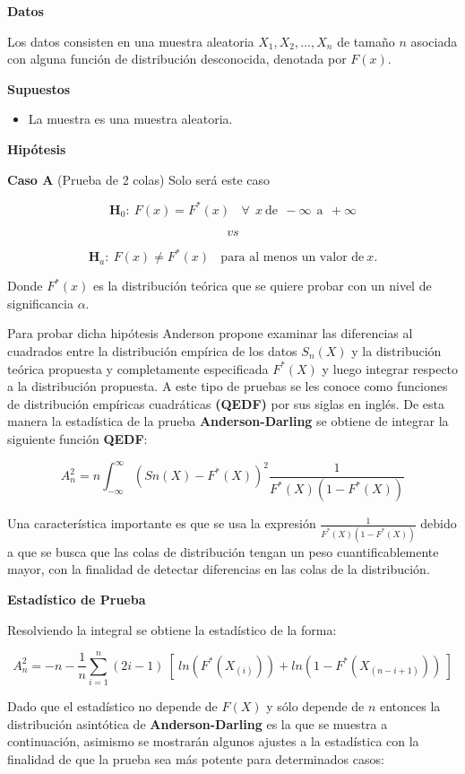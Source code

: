 \documentclass[
  a4paper,
  oneside,
  openany]{book}
\providecommand{\tightlist}{%
  \setlength{\itemsep}{0pt}\setlength{\parskip}{0pt}}
\begin{document}
\textbf{Datos}

Los datos consisten en una muestra aleatoria \(X_{1},X_{2},\ldots,X_{n}\) de tamaño \(n\) asociada con alguna función de distribución desconocida, denotada por \(F(x)\).

\textbf{Supuestos}

\begin{itemize}
\tightlist
\item
  La muestra es una muestra aleatoria.
\end{itemize}

\textbf{Hipótesis}

\textbf{Caso A} (Prueba de 2 colas) Solo será este caso

\[\textbf{H}_0: \ F(x)=F^*(x) \ \ \ \ \forall\ \ x\  \mbox{de} \ \ -\infty \ \ \mbox{a} \ \  +\infty\]

\[vs\]

\[\textbf{H}_a: \ F(x) \neq F^*(x) \ \ \ \ \mbox{para al menos un  valor de} \  x.\]

Donde \(F^*(x)\) es la distribución teórica que se quiere probar con un nivel de significancia \(\alpha\).

Para probar dicha hipótesis Anderson propone examinar las diferencias al cuadrados entre la distribución empírica de los datos \(S_{n}(X)\) y la distribución teórica propuesta y completamente
especificada \(F^*(X)\) y luego integrar respecto a la distribución propuesta.
A este tipo de pruebas se les conoce como funciones de distribución empíricas cuadráticas \textbf{(QEDF)} por
sus siglas en inglés.
De esta manera la estadística de la prueba \textbf{Anderson-Darling} se obtiene de integrar la
siguiente función \textbf{QEDF}:

\[A_n^2=n \int_{-\infty}^{\infty} (Sn(X)-F^*(X))^2 \frac{1}{F^*(X)(1-F^*(X))}\]

Una característica importante es que se usa la expresión \(\frac{1}{F^*(X)(1-F^*(X))}\)
debido a que se busca que las colas de distribución tengan un peso cuantificablemente mayor, con la finalidad de detectar diferencias en las colas de la distribución.

\textbf{Estadístico de Prueba}

Resolviendo la integral se obtiene la estadístico de la forma:

\[A_n^2=-n-\frac{1}{n}\sum_{i=1}^{n}\left(2i-1\right) \ [ \ ln(F^*(X_{(i)})) +ln(1-F^*(X_{(n-i+1)})) \ ]\]

Dado que el estadístico no depende de \(F(X)\) y sólo depende de \(n\) entonces la distribución
asintótica de \textbf{Anderson-Darling} es la que se muestra a continuación, asimismo se mostrarán algunos
ajustes a la estadística con la finalidad de que la prueba sea más potente para determinados
casos:
\end{document}
